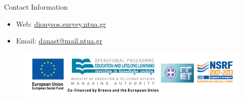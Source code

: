 \documentclass[final,a0,portrait]{beamer}
\newlength{\onecolwid}
\begin{document}
\begin{frame}[t]
\begin{columns}[t]
\begin{column}{\onecolwid}

\begin{alertblock}{Contact Information}
\begin{itemize}
\item Web: \href{http://dionysos.survey.ntua.gr}{dionysos.survey.ntua.gr}
\item Email: \href{danast@mail.ntua.gr}{danast@mail.ntua.gr}
\end{itemize}
\end{alertblock}

\begin{figure}
\includegraphics[width=1.0\linewidth]{ESPA-EKT-GSRT_Logo-EN.JPG}
\end{figure}


\end{column} %

\end{columns} %

\end{frame} %
\end{document}
